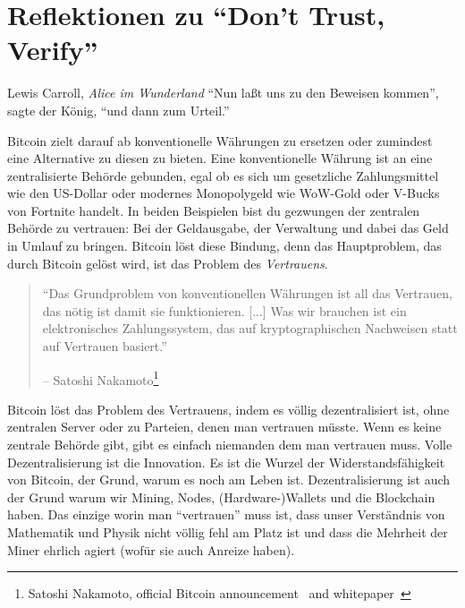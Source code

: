 \chapter{Reflektionen zu \enquote{Don't Trust, Verify}}
\label{les:16}

\begin{chapquote}{Lewis Carroll, \textit{Alice im Wunderland}}
\enquote{Nun laßt uns zu den Beweisen kommen}, sagte der König, \enquote{und dann zum Urteil.}
\end{chapquote}

Bitcoin zielt darauf ab konventionelle Währungen zu ersetzen oder zumindest eine
Alternative zu diesen zu bieten. Eine konventionelle Währung ist an eine
zentralisierte Behörde gebunden, egal ob es sich um gesetzliche Zahlungsmittel
wie den US-Dollar oder modernes Monopolygeld wie WoW-Gold oder V-Bucks von
Fortnite handelt. In beiden Beispielen bist du gezwungen der zentralen Behörde
zu vertrauen: Bei der Geldausgabe, der Verwaltung und dabei das Geld in Umlauf
zu bringen. Bitcoin löst diese Bindung, denn das Hauptproblem, das durch Bitcoin
gelöst wird, ist das Problem des \textit{Vertrauens}.

\begin{quotation}\begin{samepage}
\enquote{Das Grundproblem von konventionellen Währungen ist all das Vertrauen,
das nötig ist damit sie funktionieren. [...] Was wir brauchen ist ein
elektronisches Zahlungssystem, das auf kryptographischen Nachweisen statt auf
Vertrauen basiert.}
\begin{flushright} -- Satoshi Nakamoto\footnote{Satoshi Nakamoto, official Bitcoin announcement~\cite{bitcoin-announcement} and whitepaper~\cite{whitepaper}}
\end{flushright}\end{samepage}\end{quotation}

Bitcoin löst das Problem des Vertrauens, indem es völlig dezentralisiert ist,
ohne zentralen Server oder zu Parteien, denen man vertrauen müsste. Wenn es
keine zentrale Behörde gibt, gibt es einfach niemanden dem man vertrauen muss.
Volle Dezentralisierung ist die Innovation. Es ist die Wurzel der
Widerstandsfähigkeit von Bitcoin, der Grund, warum es noch am Leben ist.
Dezentralisierung ist auch der Grund warum wir Mining, Nodes, (Hardware-)Wallets
und die Blockchain haben. Das einzige worin man \enquote{vertrauen} muss ist,
dass unser Verständnis von Mathematik und Physik nicht völlig fehl am Platz ist
und dass die Mehrheit der Miner ehrlich agiert (wofür sie auch Anreize haben).

